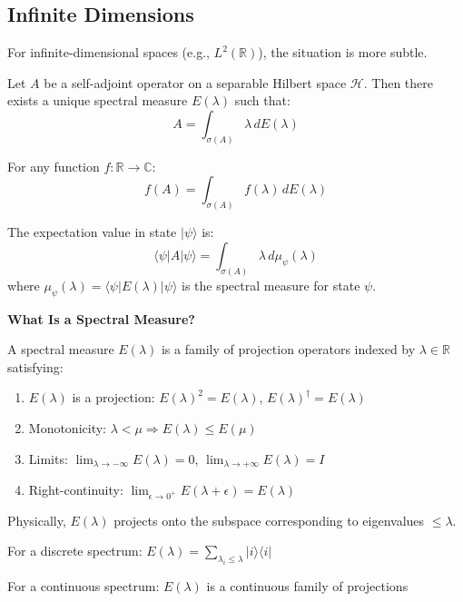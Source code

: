 \subsection{Infinite Dimensions}

For infinite-dimensional spaces (e.g., $L^2(\mathbb{R})$), the situation is more subtle.

\begin{theorem}\label{thm:spectral-theorem-infinite}
Let $A$ be a self-adjoint operator on a separable Hilbert space $\mathcal{H}$. Then there exists a unique spectral measure $E(\lambda)$ such that:
\begin{equation}
\boxed{A = \int_{\sigma(A)} \lambda \, dE(\lambda)}
\end{equation}

For any function $f: \mathbb{R} \to \mathbb{C}$:
\begin{equation}
f(A) = \int_{\sigma(A)} f(\lambda) \, dE(\lambda)
\end{equation}

The expectation value in state $|\psi\rangle$ is:
\begin{equation}
\langle \psi | A | \psi \rangle = \int_{\sigma(A)} \lambda \, d\mu_\psi(\lambda)
\end{equation}
where $\mu_\psi(\lambda) = \langle \psi | E(\lambda) | \psi \rangle$ is the spectral measure for state $\psi$.
\end{theorem}

\begin{level2}
\textbf{What Is a Spectral Measure?}

A spectral measure $E(\lambda)$ is a family of projection operators indexed by $\lambda \in \mathbb{R}$ satisfying:
\begin{enumerate}
\item $E(\lambda)$ is a projection: $E(\lambda)^2 = E(\lambda)$, $E(\lambda)^\dagger = E(\lambda)$
\item Monotonicity: $\lambda < \mu \Rightarrow E(\lambda) \leq E(\mu)$
\item Limits: $\lim_{\lambda \to -\infty} E(\lambda) = 0$, $\lim_{\lambda \to +\infty} E(\lambda) = I$
\item Right-continuity: $\lim_{\epsilon \to 0^+} E(\lambda + \epsilon) = E(\lambda)$
\end{enumerate}

Physically, $E(\lambda)$ projects onto the subspace corresponding to eigenvalues $\leq \lambda$.

For a discrete spectrum: $E(\lambda) = \sum_{\lambda_i \leq \lambda} |i\rangle\langle i|$

For a continuous spectrum: $E(\lambda)$ is a continuous family of projections
\end{level2}

